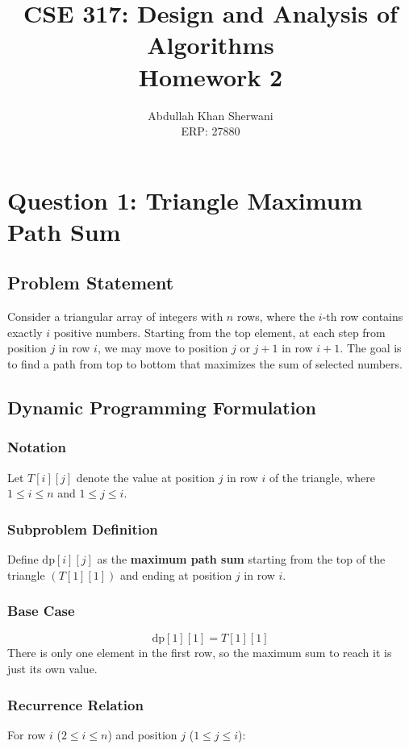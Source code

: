 \documentclass[12pt,a4paper]{article}
\title{\textbf{CSE 317: Design and Analysis of Algorithms} \\ Homework 2}
\author{Abdullah Khan Sherwani \\ ERP: 27880}
\date{}
\begin{document}
\maketitle

\section*{Question 1: Triangle Maximum Path Sum}

\subsection*{Problem Statement}
Consider a triangular array of integers with $n$ rows, where the $i$-th row contains exactly $i$ positive numbers. Starting from the top element, at each step from position $j$ in row $i$, we may move to position $j$ or $j+1$ in row $i+1$. The goal is to find a path from top to bottom that maximizes the sum of selected numbers.

\subsection*{Dynamic Programming Formulation}

\subsubsection*{Notation}
Let $T[i][j]$ denote the value at position $j$ in row $i$ of the triangle, where $1 \le i \le n$ and $1 \le j \le i$.

\subsubsection*{Subproblem Definition}
Define $\text{dp}[i][j]$ as the \textbf{maximum path sum} starting from the top of the triangle $(T[1][1])$ and ending at position $j$ in row $i$.

\subsubsection*{Base Case}
\[
    \text{dp}[1][1] = T[1][1]
\]
There is only one element in the first row, so the maximum sum to reach it is just its own value.

\subsubsection*{Recurrence Relation}
For row $i$ ($2 \le i \le n$) and position $j$ ($1 \le j \le i$):
\end{document}
